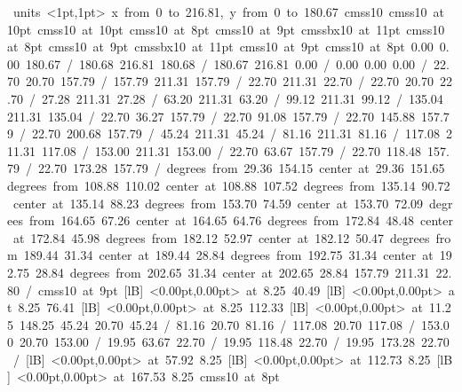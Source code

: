 \hbox{\beginpicture
\setcoordinatesystem units <1pt,1pt>
\setplotarea x from 0 to 216.81, y from 0 to 180.67
\setlinear
\font\picfont cmss10\picfont
\font\picfont cmss10 at 10pt\picfont
\font\picfont cmss10 at 10pt\picfont
\font\picfont cmss10 at 8pt\picfont
\font\picfont cmss10 at 9pt\picfont
\font\picfont cmssbx10 at 11pt\picfont
\font\picfont cmss10 at 8pt\picfont
\font\picfont cmss10 at 9pt\picfont
\font\picfont cmssbx10 at 11pt\picfont
\font\picfont cmss10 at 9pt\picfont
\font\picfont cmss10 at 8pt\picfont
\setsolid
{} 0.00 0.00 180.67 /
 180.68 216.81 180.68 /
 180.67 216.81 0.00 /
 0.00 0.00 0.00 /
\setsolid
{} 22.70 20.70 157.79 /
 157.79 211.31 157.79 /
 22.70 211.31 22.70 /
 22.70 20.70 22.70 /
\setsolid
{} 27.28 211.31 27.28 /
\setsolid
{} 63.20 211.31 63.20 /
\setsolid
{} 99.12 211.31 99.12 /
\setsolid
{} 135.04 211.31 135.04 /
\setsolid
{} 22.70 36.27 157.79 /
\setsolid
{} 22.70 91.08 157.79 /
\setsolid
{} 22.70 145.88 157.79 /
\setsolid
{} 22.70 200.68 157.79 /
\setsolid
{} 45.24 211.31 45.24 /
\setsolid
{} 81.16 211.31 81.16 /
\setsolid
{} 117.08 211.31 117.08 /
\setsolid
{} 153.00 211.31 153.00 /
\setsolid
{} 22.70 63.67 157.79 /
\setsolid
{} 22.70 118.48 157.79 /
\setsolid
{} 22.70 173.28 157.79 /
 degrees from 29.36 154.15 center at 29.36 151.65
 degrees from 108.88 110.02 center at 108.88 107.52
 degrees from 135.14 90.72 center at 135.14 88.23
 degrees from 153.70 74.59 center at 153.70 72.09
 degrees from 164.65 67.26 center at 164.65 64.76
 degrees from 172.84 48.48 center at 172.84 45.98
 degrees from 182.12 52.97 center at 182.12 50.47
 degrees from 189.44 31.34 center at 189.44 28.84
 degrees from 192.75 31.34 center at 192.75 28.84
 degrees from 202.65 31.34 center at 202.65 28.84
\setdashpattern <4pt, 4pt>
 157.79 211.31 22.80 /
\font\picfont cmss10 at 9pt\picfont
{}  [lB] <0.00pt,0.00pt> at 8.25 40.49
  [lB] <0.00pt,0.00pt> at 8.25 76.41
  [lB] <0.00pt,0.00pt> at 8.25 112.33
  [lB] <0.00pt,0.00pt> at 11.25 148.25
\setsolid
{} 45.24 20.70 45.24 /
\setsolid
{} 81.16 20.70 81.16 /
\setsolid
{} 117.08 20.70 117.08 /
\setsolid
{} 153.00 20.70 153.00 /
\setsolid
{} 19.95 63.67 22.70 /
\setsolid
{} 19.95 118.48 22.70 /
\setsolid
{} 19.95 173.28 22.70 /
  [lB] <0.00pt,0.00pt> at 57.92 8.25
  [lB] <0.00pt,0.00pt> at 112.73 8.25
  [lB] <0.00pt,0.00pt> at 167.53 8.25
\font\picfont cmss10 at 8pt\picfont
\endpicture
}

